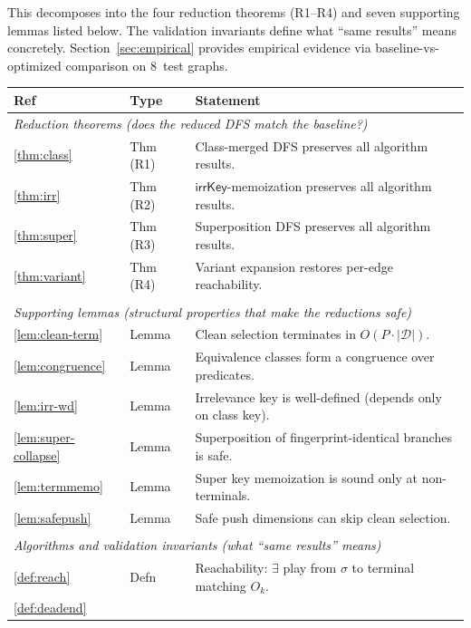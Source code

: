 \documentclass[11pt]{article}
\theoremstyle{definition}
\newcommand{\Dim}{\mathcal{D}}         %
\newcommand{\sel}{\sigma}              %
\newcommand{\ik}{\mathsf{irrKey}}      %
\begin{document}
\noindent
This decomposes into the four reduction theorems (R1--R4) and seven
supporting lemmas listed below. The validation invariants define what
``same results'' means concretely. Section~\ref{sec:empirical} provides
empirical evidence via baseline-vs-optimized comparison on 8~test graphs.

\bigskip

\begin{center}
\begin{tabular}{llp{7.5cm}}
\textbf{Ref} & \textbf{Type} & \textbf{Statement} \\
\hline
\multicolumn{3}{l}{\emph{Reduction theorems
  (does the reduced DFS match the baseline?)}} \\[2pt]
\ref{thm:class}
  & Thm (R1)
  & Class-merged DFS preserves all algorithm results. \\
\ref{thm:irr}
  & Thm (R2)
  & $\ik$-memoization preserves all algorithm results. \\
\ref{thm:super}
  & Thm (R3)
  & Superposition DFS preserves all algorithm results. \\
\ref{thm:variant}
  & Thm (R4)
  & Variant expansion restores per-edge reachability. \\[4pt]
\hline
\\[-6pt]
\multicolumn{3}{l}{\emph{Supporting lemmas
  (structural properties that make the reductions safe)}} \\[2pt]
\ref{lem:clean-term}
  & Lemma
  & Clean selection terminates in $O(P \cdot |\Dim|)$. \\
\ref{lem:congruence}
  & Lemma
  & Equivalence classes form a congruence over predicates. \\
\ref{lem:irr-wd}
  & Lemma
  & Irrelevance key is well-defined (depends only on class key). \\
\ref{lem:super-collapse}
  & Lemma
  & Superposition of fingerprint-identical branches is safe. \\
\ref{lem:termmemo}
  & Lemma
  & Super key memoization is sound only at non-terminals. \\
\ref{lem:safepush}
  & Lemma
  & Safe push dimensions can skip clean selection. \\[4pt]
\hline
\\[-6pt]
\multicolumn{3}{l}{\emph{Algorithms and validation invariants
  (what ``same results'' means)}} \\[2pt]
\ref{def:reach}
  & Defn
  & Reachability: $\exists$ play from $\sel$ to terminal matching $O_k$. \\
\ref{def:deadend}

\end{tabular}
\end{center}
\end{document}
